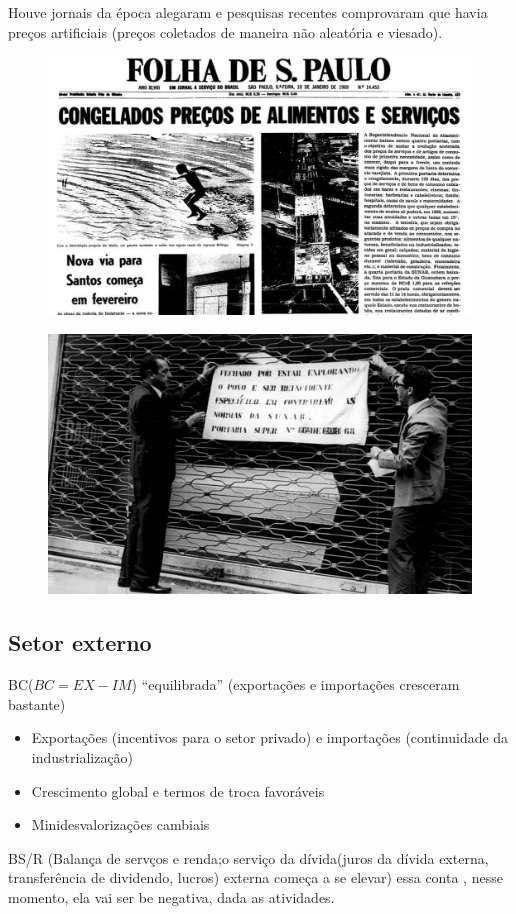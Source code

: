 \documentclass[a4paper,12pt]{article}[abntex2]
\begin{document}
Houve jornais da época alegaram e pesquisas recentes comprovaram que havia preços artificiais (preços coletados de maneira não aleatória e viesado).

\begin{figure}[H]
    \centering
    \includegraphics[width=0.7\linewidth]{Imagens/a4i1.png}
\end{figure}

\begin{figure}[H]
    \centering
    \includegraphics[width=0.7\linewidth]{Imagens/a4i2.png}
\end{figure}

\subsection{\textbf{Setor externo}}
BC(\(BC=EX-IM\)) “equilibrada” (exportações e importações cresceram bastante)\begin{itemize}
    \item Exportações (incentivos para o setor privado) e importações (continuidade da industrialização)
    \item Crescimento global e termos de troca favoráveis
    \item Minidesvalorizações cambiais
\end{itemize}

BS/R (Balança de servços e renda;o serviço da dívida(juros da dívida externa, transferência de dividendo, lucros) externa começa a se elevar) essa conta , nesse momento, ela vai ser be negativa, dada as atividades.
\end{document}
